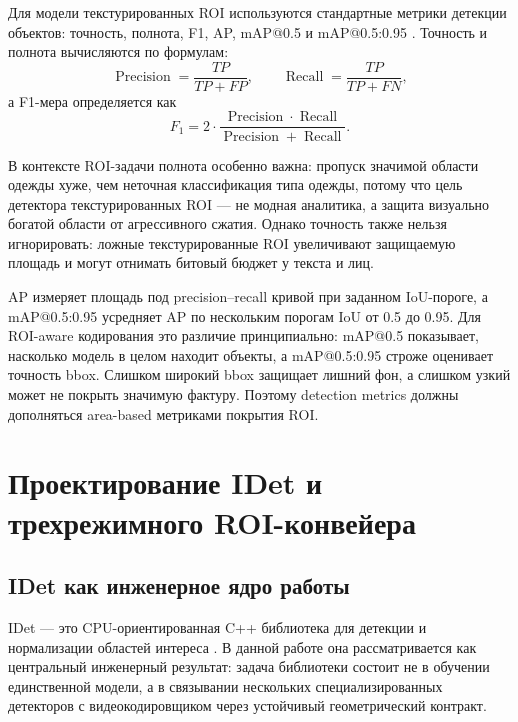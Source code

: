 \documentclass[12pt,a4paper,oneside,openany]{report}
\begin{document}
Для модели текстурированных ROI используются стандартные метрики детекции объектов: точность, полнота, F1, AP, mAP@0.5 и mAP@0.5:0.95 \cite{ultra_metrics}. Точность и полнота вычисляются по формулам:
\begin{equation}\operatorname{Precision} =\frac{TP}{TP+FP},\qquad\operatorname{Recall} =\frac{TP}{TP+FN},\label{eq:precision_recall}
\end{equation}а F1-мера определяется как
\begin{equation}F_1 =2 \cdot\frac{\operatorname{Precision}\cdot\operatorname{Recall}}{\operatorname{Precision}+\operatorname{Recall}}.\label{eq:f1}
\end{equation}

В контексте ROI-задачи полнота особенно важна: пропуск значимой области одежды хуже, чем неточная классификация типа одежды, потому что цель детектора текстурированных ROI --- не модная аналитика, а защита визуально богатой области от агрессивного сжатия. Однако точность также нельзя игнорировать: ложные текстурированные ROI увеличивают защищаемую площадь и могут отнимать битовый бюджет у текста и лиц.

AP измеряет площадь под precision--recall кривой при заданном IoU-пороге, а mAP@0.5:0.95 усредняет AP по нескольким порогам IoU от 0.5 до 0.95. Для ROI-aware кодирования это различие принципиально: mAP@0.5 показывает, насколько модель в целом находит объекты, а mAP@0.5:0.95 строже оценивает точность bbox. Слишком широкий bbox защищает лишний фон, а слишком узкий может не покрыть значимую фактуру. Поэтому detection metrics должны дополняться area-based метриками покрытия ROI.


\chapter{Проектирование IDet и трехрежимного ROI-конвейера}

\section{IDet как инженерное ядро работы}

IDet --- это CPU-ориентированная C++ библиотека для детекции и нормализации областей интереса \cite{idet}. В данной работе она рассматривается как центральный инженерный результат: задача библиотеки состоит не в обучении единственной модели, а в связывании нескольких специализированных детекторов с видеокодировщиком через устойчивый геометрический контракт.
\end{document}
